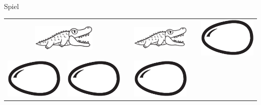 \begin{frame}{Spiel}
	\begin{center}
		\begin{tabular}{rccccl}
			\multicolumn{2}{c}{
				\includegraphics[height=1.25cm]{media/alligator_blank}
			}
			& &
			\includegraphics[height=1.25cm]{media/alligator_blank}
			& &
			\includegraphics[height=.75cm]{media/egg_blank}
			\\
			\includegraphics[height=.75cm]{media/egg_blank}
			&
			\includegraphics[height=.75cm]{media/egg_blank}
			& &
			\includegraphics[height=.75cm]{media/egg_blank}
		\end{tabular}
	\end{center}
\end{frame}
